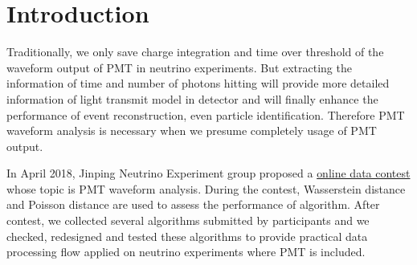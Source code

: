 \section{Introduction} %
\label{sec:Introduction}
Traditionally, we only save charge integration and time over threshold of the waveform output of PMT in neutrino experiments. But extracting the information of time and number of photons hitting will provide more detailed information of light transmit model in detector and will finally enhance the performance of event reconstruction, even particle identification. Therefore PMT waveform analysis is necessary when we presume completely usage of PMT output. 

In April 2018, Jinping Neutrino Experiment group proposed a \href{https://mp.weixin.qq.com/s?__biz=MzA4MTAwMzgzOA==&mid=2650872289&idx=2&sn=48145a6598545d201f940e0459de99dd&chksm=846e2db0b319a4a627e902d0d6ed4b9d968225566021342c5935764963f352fbe02db1bdb333&mpshare=1&scene=1&srcid=0307c4HOvK0ChJUcq9blC3ub%23rd}{online data contest} whose topic is PMT waveform analysis. During the contest, Wasserstein distance and Poisson distance are used to assess the performance of algorithm. After contest, we collected several algorithms submitted by participants and we checked, redesigned and tested these algorithms to provide practical data processing flow applied on neutrino experiments where PMT is included. 
